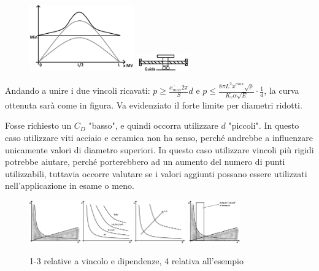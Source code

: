 \begin{figure}[h]
    \centering
    \includegraphics[width=0.4\textwidth]{Immagini/vel_critica_vite_2sol.png}
    \includegraphics[width=0.2\textwidth]{Immagini/vite_guida_MV.png}
\end{figure}

Andando a unire i due vincoli ricavati: \(p \geqslant \frac{\dot{x_{max}} 2\pi }{S} d\) e \( p \leqslant \frac{8\pi L^2 \dot{x}^{max} \sqrt{\rho}}{K_v \alpha \sqrt{E}} \cdot \frac{1}{d} \), la curva ottenuta sarà come in figura. Va evidenziato il forte limite per diametri ridotti.

Fosse richiesto un \( C_D \) "basso", e quindi occorra utilizzare \(d\) "piccoli". In questo caso utilizzare viti acciaio e ceramica non ha senso, perché andrebbe a influenzare unicamente valori di diametro superiori. In questo caso utilizzare vincoli più rigidi potrebbe aiutare, perché porterebbero ad un aumento del numero di punti utilizzabili, tuttavia occorre valutare se i valori aggiunti possano essere utilizzati nell'applicazione in esame o meno.

\begin{figure}[h]
    \centering
    \includegraphics[width=0.6\textwidth]{Immagini/viti_ricir_vincoli_p_d.png}
    \includegraphics[width=0.2\textwidth]{Immagini/viti_ricir_esempio_vincoli.png}
    \caption{1-3 relative a vincolo e dipendenze, 4 relativa all'esempio}
\end{figure}


